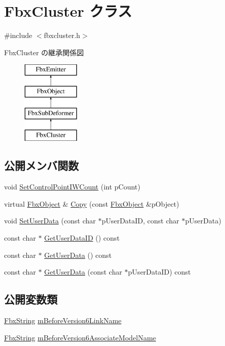 \hypertarget{class_fbx_cluster}{}\section{Fbx\+Cluster クラス}
\label{class_fbx_cluster}


{\ttfamily \#include $<$fbxcluster.\+h$>$}

Fbx\+Cluster の継承関係図\begin{figure}[H]
\begin{center}
\leavevmode
\includegraphics[height=4.000000cm]{class_fbx_cluster}
\end{center}
\end{figure}
\subsection*{公開メンバ関数}
\begin{DoxyCompactItemize}
\item 
void \hyperlink{class_fbx_cluster_a4772d095f168a919e12b03598219cf05}{Set\+Control\+Point\+I\+W\+Count} (int p\+Count)
\item 
virtual \hyperlink{class_fbx_object}{Fbx\+Object} \& \hyperlink{class_fbx_cluster_ac18a0581408958c73f56dd37790c40a9}{Copy} (const \hyperlink{class_fbx_object}{Fbx\+Object} \&p\+Object)
\item 
void \hyperlink{class_fbx_cluster_a8b2707b5d49a1e3e565884056df011f0}{Set\+User\+Data} (const char $\ast$p\+User\+Data\+ID, const char $\ast$p\+User\+Data)
\item 
const char $\ast$ \hyperlink{class_fbx_cluster_ad9b7d68a8bb3ad4141ff79cc1c01304d}{Get\+User\+Data\+ID} () const
\item 
const char $\ast$ \hyperlink{class_fbx_cluster_afd18bfe36ed5844ad6710629a68dc54f}{Get\+User\+Data} () const
\item 
const char $\ast$ \hyperlink{class_fbx_cluster_a5630b99cd6fadf8e839543f5471154d1}{Get\+User\+Data} (const char $\ast$p\+User\+Data\+ID) const
\end{DoxyCompactItemize}
\subsection*{公開変数類}
\begin{DoxyCompactItemize}
\item 
\hyperlink{class_fbx_string}{Fbx\+String} \hyperlink{class_fbx_cluster_ae78fd5670171a4d0ec2b8e86cc9dcd1b}{m\+Before\+Version6\+Link\+Name}
\item 
\hyperlink{class_fbx_string}{Fbx\+String} \hyperlink{class_fbx_cluster_a96b44a5dd28301425c0412b3cf4ea729}{m\+Before\+Version6\+Associate\+Model\+Name}
\end{DoxyCompactItemize}
